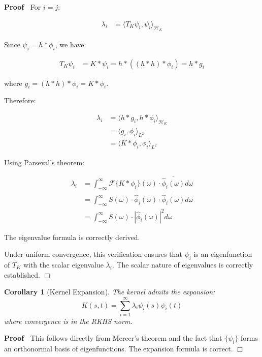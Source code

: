 \documentclass{article}
\newcommand{\tmcolor}[2]{{\color{#1}{#2}}}
\newenvironment{proof}{\noindent\textbf{Proof\ }}{\hspace*{\fill}$\Box$\medskip}
\newtheorem{corollary}{Corollary}
\begin{document}
\begin{proof}
  For $i = j$:
  
  \begin{align}
    \lambda_i & = \langle T_K \psi_i, \psi_i \rangle_{\mathcal{H}_K} 
  \end{align}
  
  Since $\psi_i = h \ast \phi_i$, we have:
  
  \begin{align}
    T_K \psi_i & = K \ast \psi_i = h \ast ((h \ast h) \ast \phi_i) = h \ast
    g_i 
  \end{align}
  
  where $g_i = (h \ast h) \ast \phi_i = K \ast \phi_i$.
  
  Therefore:
  
  \begin{align}
    \lambda_i & = \langle h \ast g_i, h \ast \phi_i \rangle_{\mathcal{H}_K} \\
    & = \langle g_i, \phi_i \rangle_{L^2} \\
    & = \langle K \ast \phi_i, \phi_i \rangle_{L^2} 
  \end{align}
  
  Using Parseval's theorem:
  
  \begin{align}
    \lambda_i & = \int_{- \infty}^{\infty} \mathcal{F} \{K \ast \phi_i \}
    (\omega) \cdot \overline{\hat{\phi}_i (\omega)} d \omega \\
    & = \int_{- \infty}^{\infty} S (\omega) \cdot \hat{\phi}_i (\omega) \cdot
    \overline{\hat{\phi}_i (\omega)} d \omega \\
    & = \int_{- \infty}^{\infty} S (\omega) \cdot | \hat{\phi}_i (\omega) |^2
    d \omega 
  \end{align}
  
  \tmcolor{green}{{\checkmark}} The eigenvalue formula is correctly derived.
  
  Under uniform convergence, this verification ensures that $\psi_i$ is an
  eigenfunction of $T_K$ with the scalar eigenvalue $\lambda_i$.
  \tmcolor{green}{{\checkmark}} The scalar nature of eigenvalues is correctly
  established.
\end{proof}

\begin{corollary}
  [Kernel Expansion] The kernel admits the expansion:
  \[ K (s, t) = \sum_{i = 1}^{\infty} \lambda_i \psi_i (s) \psi_i (t) \]
  where convergence is in the RKHS norm.
\end{corollary}

\begin{proof}
  This follows directly from Mercer's theorem and the fact that $\{\psi_i \}$
  forms an orthonormal basis of eigenfunctions. \tmcolor{green}{{\checkmark}}
  The expansion formula is correct.
\end{proof}
\end{document}
